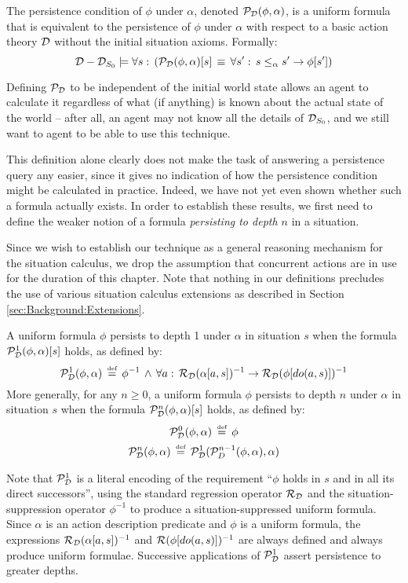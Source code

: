 \begin{defnL}
 The persistence condition of $\phi$
under $\alpha$, denoted $\mathcal{P}_{\mathcal{D}}(\phi,\alpha)$, is a uniform
formula that is equivalent to the persistence of $\phi$ under $\alpha$
with respect to a basic action theory $\mathcal{D}$ without the initial situation
axioms. Formally:\label{def:persistence-condition}\[
\mathcal{D}-\mathcal{D}_{S_{0}}\models\forall s:\,\left(\mathcal{P}_{\mathcal{D}}(\phi,\alpha)[s]\,\equiv\,\forall s':\, s\leq_{\alpha}s'\rightarrow\phi[s']\right)\]

\end{defnL}
Defining $\mathcal{P}_{\mathcal{D}}$ to be independent of the initial world state
allows an agent to calculate it regardless of what (if anything) is
known about the actual state of the world -- after all, an agent may
not know all the details of $\mathcal{D}_{S_{0}}$, and we still want to agent
to be able to use this technique.

This definition alone clearly does not make the task of answering
a persistence query any easier, since it gives no indication of how
the persistence condition might be calculated in practice. Indeed,
we have not yet even shown whether such a formula actually exists.
In order to establish these results, we first need to define the weaker
notion of a formula \emph{persisting to depth $n$} in a situation.

Since we wish to establish our technique as a general reasoning mechanism
for the situation calculus, we drop the assumption that concurrent
actions are in use for the duration of this chapter. Note that nothing
in our definitions precludes the use of various situation calculus
extensions as described in Section \ref{sec:Background:Extensions}.

\begin{defnL}
 A uniform formula $\phi$ persists
to depth 1 under $\alpha$ in situation $s$ when the formula $\mathcal{P}_{\mathcal{D}}^{1}(\phi,\alpha)[s]$
holds, as defined by:\label{def:persists-depth-n}\[
\mathcal{P}_{\mathcal{D}}^{1}(\phi,\alpha)\,\stackrel{\mbox{\tiny def}}{=}\,\phi^{-1}\,\wedge\,\forall a:\,\mathcal{R}_{\mathcal{D}}(\alpha[a,s])^{-1}\rightarrow\mathcal{R}_{\mathcal{D}}(\phi[do(a,s)])^{-1}\]
 More generally, for any $n\geq0$, a uniform formula $\phi$ persists
to depth $n$ under $\alpha$ in situation $s$ when the formula $\mathcal{P}_{\mathcal{D}}^{n}(\phi,\alpha)[s]$
holds, as defined by:\begin{gather*}
\mathcal{P}_{\mathcal{D}}^{0}(\phi,\alpha)\,\stackrel{\mbox{\tiny def}}{=}\,\phi\\
\mathcal{P}_{\mathcal{D}}^{n}(\phi,\alpha)\,\stackrel{\mbox{\tiny def}}{=}\,\mathcal{P}_{\mathcal{D}}^{1}(\mathcal{P}_{D}^{n-1}(\phi,\alpha),\alpha)\end{gather*}

\end{defnL}
Note that $\mathcal{P}_{\mathcal{D}}^{1}$ is a literal encoding of the requirement
{}``$\phi$ holds in $s$ and in all its direct successors'', using
the standard regression operator $\mathcal{R}_{\mathcal{D}}$ and the situation-suppression
operator $\phi^{-1}$ to produce a situation-suppressed uniform formula.
Since $\alpha$ is an action description predicate and $\phi$ is
a uniform formula, the expressions $\mathcal{R}_{\mathcal{D}}(\alpha[a,s])^{-1}$
and $\mathcal{R}(\phi[do(a,s)])^{-1}$ are always defined and always produce
uniform formulae. Successive applications of $\mathcal{P}_{\mathcal{D}}^{1}$ assert
persistence to greater depths.

